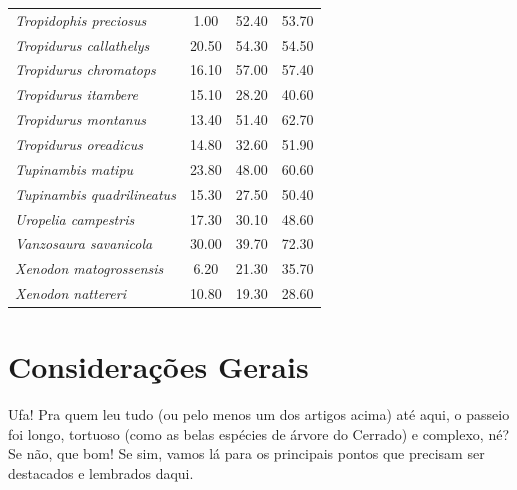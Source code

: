 \documentclass[12pt,openright,oneside,a4paper,english]{abntex2}
\begin{document}
\begin{longtable}{lccc}
	\textit{Tropidophis preciosus}&1.00 &52.40 &53.70 \\
	\textit{Tropidurus callathelys}&20.50 &54.30 &54.50 \\
	\textit{Tropidurus chromatops}&16.10 &57.00 &57.40 \\
	\textit{Tropidurus itambere}&15.10 &28.20 &40.60 \\
	\textit{Tropidurus montanus}&13.40 &51.40 &62.70 \\
	\textit{Tropidurus oreadicus}&14.80 &32.60 &51.90 \\
	\textit{Tupinambis matipu}&23.80 &48.00 &60.60 \\
	\textit{Tupinambis quadrilineatus}&15.30 &27.50 &50.40 \\
	\textit{Uropelia campestris}&17.30 &30.10 &48.60 \\
	\textit{Vanzosaura savanicola}&30.00 &39.70 &72.30 \\
	\textit{Xenodon matogrossensis}&6.20 &21.30 &35.70 \\
	\textit{Xenodon nattereri}&10.80 &19.30 &28.60 \\
	
\end{longtable}

\addtocounter{table}{-1}

\chapter*[Considerações Gerais]{Considerações Gerais}


Ufa! Pra quem leu tudo (ou pelo menos um dos artigos acima) até aqui, o passeio foi longo, tortuoso (como as belas espécies de árvore do Cerrado) e complexo, né? Se não, que bom! Se sim, vamos lá para os principais pontos que precisam ser destacados e lembrados daqui.
\end{document}
